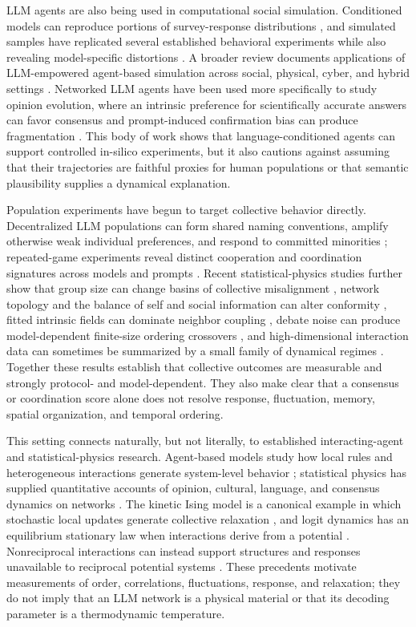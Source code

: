 \documentclass[12pt]{article}
\begin{document}
LLM agents are also being used in computational social simulation.  Conditioned
models can reproduce portions of survey-response distributions
\cite{argyle2023}, and simulated samples have replicated several established
behavioral experiments while also revealing model-specific distortions
\cite{aher2023}.  A broader review documents applications of LLM-empowered
agent-based simulation across social, physical, cyber, and hybrid settings
\cite{gao2024abm}.  Networked LLM agents have been used more specifically to
study opinion evolution, where an intrinsic preference for scientifically
accurate answers can favor consensus and prompt-induced confirmation bias can
produce fragmentation \cite{chuang2024}.  This body of work shows that
language-conditioned agents can support controlled in-silico experiments, but
it also cautions against assuming that their trajectories are faithful proxies
for human populations or that semantic plausibility supplies a dynamical
explanation.

Population experiments have begun to target collective behavior directly.
Decentralized LLM populations can form shared naming conventions, amplify
otherwise weak individual preferences, and respond to committed minorities
\cite{flintashery2025}; repeated-game experiments reveal distinct cooperation
and coordination signatures across models and prompts \cite{akata2025}.
Recent statistical-physics studies further show that group size can change
basins of collective misalignment \cite{flint2025}, network topology and the
balance of self and social information can alter conformity
\cite{han2026}, fitted intrinsic fields can dominate neighbor coupling
\cite{denobili2026}, debate noise can produce model-dependent finite-size
ordering crossovers \cite{okawa2026}, and high-dimensional interaction data can
sometimes be summarized by a small family of dynamical regimes
\cite{el2026}.  Together these results establish that collective outcomes are
measurable and strongly protocol- and model-dependent.  They also make clear
that a consensus or coordination score alone does not resolve response,
fluctuation, memory, spatial organization, and temporal ordering.

This setting connects naturally, but not literally, to established
interacting-agent and statistical-physics research.  Agent-based models study
how local rules and heterogeneous interactions generate system-level behavior
\cite{bonabeau2002}; statistical physics has supplied quantitative accounts of
opinion, cultural, language, and consensus dynamics on networks
\cite{castellano2009,baronchelli2018}.  The kinetic Ising model is a canonical
example in which stochastic local updates generate collective relaxation
\cite{glauber1963}, and logit dynamics has an equilibrium stationary law when
interactions derive from a potential \cite{blume1993}.  Nonreciprocal
interactions can instead support structures and responses unavailable to
reciprocal potential systems \cite{fruchart2021}.  These precedents
motivate measurements of order, correlations, fluctuations, response, and
relaxation; they do not imply that an LLM network is a physical material or
that its decoding parameter is a thermodynamic temperature.
\end{document}
